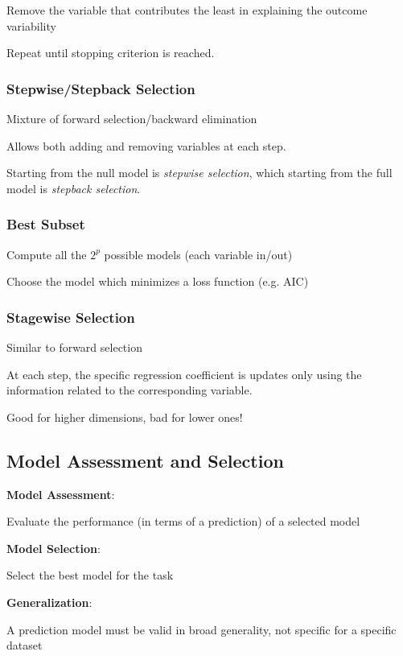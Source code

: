 \documentclass[twoside,twocolumn,10pt]{revtex4-1}
\begin{document}
	Remove the variable that contributes the least in explaining the outcome variability
	
	Repeat until stopping criterion is reached.
	
	\subsubsection{Stepwise/Stepback Selection}
	
	Mixture of forward selection/backward elimination
	
	Allows both adding and removing variables at each step.
	
	Starting from the null model is \textit{stepwise selection}, which starting from the full model is \textit{stepback selection}.
	
	\subsubsection{Best Subset}
	
	Compute all the $2^p$ possible models (each variable in/out)
	
	Choose the model which minimizes a loss function (e.g. AIC)
	
	\subsubsection{Stagewise Selection}
	
	Similar to forward selection
	
	At each step, the specific regression coefficient is updates only using the information related to the corresponding variable.
	
	Good for higher dimensions, bad for lower ones!
	
	\subsection{Model Assessment and Selection}	
	
	\textbf{Model Assessment}:
	
	Evaluate the performance (in terms of a prediction) of a selected model
	
	\textbf{Model Selection}:
	
	Select the best model for the task
	
	\textbf{Generalization}:
	
	A prediction model must be valid in broad generality, not specific for a specific dataset
	
\end{document}
